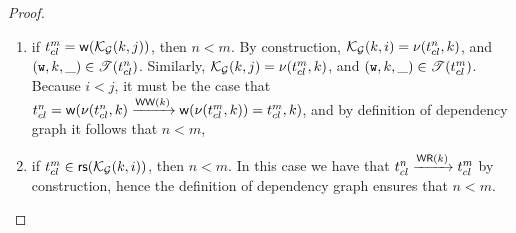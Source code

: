 \begin{proof}
\begin{enumerate}[label=(\roman*)]
\begin{enumerate}
\item if $\txid_{\cl}^{m} = \WTx(\mkvs_{\Gr}(\key, j))$, then $n < m$. By construction, 
$\mathcal{K}_{\mathcal{G}}(k, i) = \nu(t_{cl}^{n}, k)$, and $(\textnormal{\texttt w}, k, \_) \in \mathscr{T}(t_{cl}^{n})$. 
Similarly, $\mathcal{K}_{\mathcal{G}}(k, j) = \nu(t_{cl}^{m}, k)$, and $(\textnormal{\texttt w}, k, \_) \in \mathscr{T}(t_{cl}^{m})$. 
Because $i < j$, it must be the case that $\txid_{\cl}^{n} = \WTx(\ver(\txid_{\cl}^{n}, \key) \xrightarrow{\WW(\key)} 
\WTx(\ver(\txid_{\cl}^{m}, \key)) = \txid_{\cl}^{m}, \key)$, and by definition of dependency graph it follows that 
$n < m$, 
\item if $\txid_{\cl}^{m} \in \RTx(\mkvs_{\Gr}(\key, i))$, then $n < m$. In this case we have that 
$t_{cl}^{n} \xrightarrow{\mathsf{WR}(k)} t_{cl}^{m}$ by construction, hence the definition 
of dependency graph ensures that $n < m$. 
\end{enumerate}
\end{enumerate}
\end{proof}

